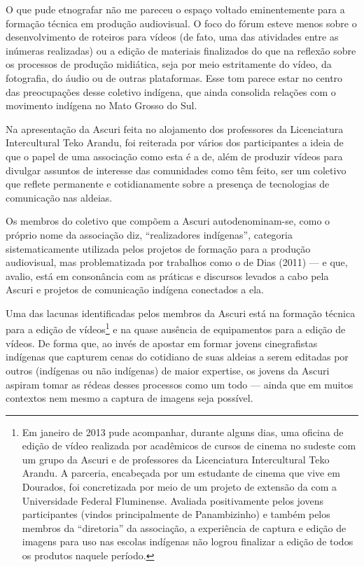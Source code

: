 O  que pude etnografar não me pareceu o espaço voltado eminentemente
para a formação técnica em produção audiovisual. O foco do fórum esteve
menos sobre o desenvolvimento de roteiros para vídeos (de fato, uma das
atividades entre as inúmeras realizadas) ou a edição de materiais
finalizados do que na reflexão sobre os processos de produção
midiática, seja por meio estritamente do vídeo, da fotografia, do áudio
ou de outras plataformas. Esse tom parece estar no centro das
preocupações desse coletivo indígena, que ainda consolida relações com
o movimento indígena no Mato Grosso do Sul.

Na apresentação da Ascuri feita no alojamento dos professores da
Licenciatura Intercultural Teko Arandu, foi reiterada por vários dos
participantes a ideia de que o papel de uma associação como esta é a
de, além de produzir vídeos para divulgar assuntos de interesse das
comunidades como têm feito, ser um coletivo que reflete permanente e cotidianamente
sobre a presença de tecnologias de comunicação nas aldeias.

Os membros do coletivo que compõem a Ascuri autodenominam-se, como o
próprio nome da associação diz, ``realizadores indígenas'', categoria
sistematicamente utilizada pelos projetos de formação para a produção
audiovisual, mas problematizada por trabalhos como o de Dias (2011) — e
que, avalio, está em consonância com as práticas e discursos levados a
cabo pela Ascuri e projetos de comunicação indígena conectados a ela.

Uma das lacunas identificadas pelos membros da Ascuri está na formação
técnica para a edição de vídeos\footnote{Em janeiro de 2013 pude
acompanhar, durante alguns dias, uma oficina de edição de vídeo
realizada por acadêmicos de cursos de cinema no sudeste com um grupo da
Ascuri e de professores da Licenciatura Intercultural Teko Arandu. A
parceria, encabeçada por um estudante de cinema que vive em Dourados,
foi concretizada por meio de um projeto de extensão da  com a
Universidade Federal Fluminense. Avaliada positivamente pelos jovens
participantes (vindos principalmente de Panambizinho) e também pelos
membros da ``diretoria'' da associação, a experiência de captura e edição
de imagens para uso nas escolas indígenas não logrou finalizar a edição
de todos os produtos naquele período. } e na quase ausência de
equipamentos para a edição de vídeos. De forma que, ao invés de apostar
em formar jovens cinegrafistas indígenas que capturem cenas do
cotidiano de suas aldeias a serem editadas por outros (indígenas ou não
indígenas) de maior expertise, os jovens da Ascuri aspiram tomar as
rédeas desses processos como um todo — ainda que em muitos contextos
nem mesmo a captura de imagens seja possível.

